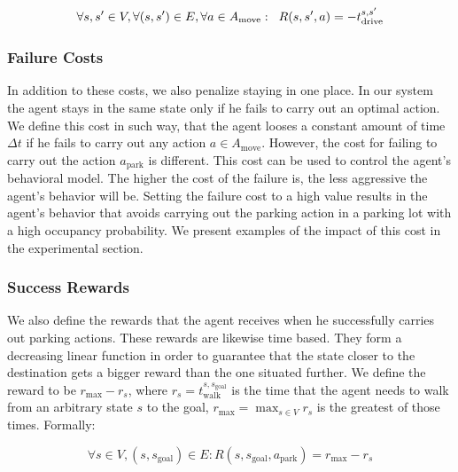 \begin{equation}
\label{eq:drive_reward}
\forall s,s' \in V, \forall (s, s') \in E, \forall a \in A_{\mathrm{move}}: \hspace{2mm} R(s, s', a) = -t_{\mathrm{drive}}^{s,s'}
\end{equation}

\subsubsection{Failure Costs} %
\label{ssub:failure_costs}

In addition to these costs, we also penalize staying in one place. In our
system the agent stays in the same state only if he fails to carry out an
optimal action. We define this cost in such way, that the agent looses a
constant amount of time $\Delta t$ if he fails to carry out any action $a \in
A_\mathrm{move}$. However, the cost for failing to carry out the action
$a_\mathrm{park}$ is different. This cost can be used to control the agent's
behavioral model. The higher the cost of the failure is, the less aggressive
the agent's behavior will be. Setting the failure cost to a high value results
in the agent's behavior that avoids carrying out the parking action in a
parking lot with a high occupancy probability. We present examples of the
impact of this cost in the experimental section.


\subsubsection{Success Rewards} %
\label{ssub:success_rewards}

We also define the rewards that the agent receives when he successfully
carries out parking actions. These rewards are likewise time based. They form
a decreasing linear function in order to guarantee that the state closer to
the destination gets a bigger reward than the one situated further. We define
the reward to be $r_{\max} - r_s$, where $r_s =
t_{\mathrm{walk}}^{s,s_{\mathrm{goal}}}$ is the time that the agent needs to
walk from an arbitrary state $s$ to the goal, $r_{\max} = \max_{s \in V}r_s$
is the greatest of those times. Formally:

\begin{equation}
\label{eq:park_reward}
\forall s \in V, (s, s_{\mathrm{goal}}) \in E : R(s, s_{\mathrm{goal}}, a_{\mathrm{park}}) = r_{\max} - r_s
\end{equation}

